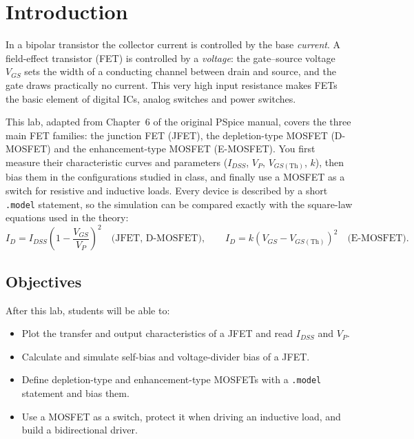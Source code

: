 \section{Introduction}

In a bipolar transistor the collector current is controlled by the base \emph{current}. A field-effect transistor (FET)
is controlled by a \emph{voltage}: the gate--source voltage $V_{GS}$ sets the width of a conducting channel between drain
and source, and the gate draws practically no current. This very high input resistance makes FETs the basic element
of digital ICs, analog switches and power switches.

This lab, adapted from Chapter~6 of the original PSpice manual, covers the three main FET families:
the junction FET (JFET), the depletion-type MOSFET (D-MOSFET) and the enhancement-type MOSFET (E-MOSFET).
You first measure their characteristic curves and parameters ($I_{DSS}$, $V_P$, $V_{GS(\mathrm{Th})}$, $k$), then
bias them in the configurations studied in class, and finally use a MOSFET as a switch for resistive and inductive loads.
Every device is described by a short \texttt{.model} statement, so the simulation can be compared exactly with the
square-law equations used in the theory:
\[
  I_D = I_{DSS}\left(1-\frac{V_{GS}}{V_P}\right)^2 \quad\text{(JFET, D-MOSFET)},\qquad
  I_D = k\left(V_{GS}-V_{GS(\mathrm{Th})}\right)^2 \quad\text{(E-MOSFET)}.
\]

\subsection{Objectives}
After this lab, students will be able to:
\begin{itemize}[itemsep=2pt]
  \item Plot the transfer and output characteristics of a JFET and read $I_{DSS}$ and $V_P$.
  \item Calculate and simulate self-bias and voltage-divider bias of a JFET.
  \item Define depletion-type and enhancement-type MOSFETs with a \texttt{.model} statement and bias them.
  \item Use a MOSFET as a switch, protect it when driving an inductive load, and build a bidirectional driver.
\end{itemize}

